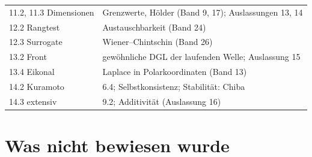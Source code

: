 \begin{merksatz}
\begin{center}
{\begin{tabular}{@{}P{3.4cm}P{5.2cm}@{}}
11.2, 11.3 Dimensionen & Grenzwerte, Hölder (Band 9, 17); Auslassungen 13, 14\\
12.2 Rangtest & Austauschbarkeit (Band 24)\\
12.3 Surrogate & Wiener--Chintschin (Band 26)\\
13.2 Front & gewöhnliche DGL der laufenden Welle; Auslassung 15\\
13.4 Eikonal & Laplace in Polarkoordinaten (Band 13)\\
14.2 Kuramoto & 6.4; Selbstkonsistenz; Stabilität: Chiba\\
14.3 extensiv & 9.2; Additivität (Auslassung 16)\\
\bottomrule
\end{tabular}}
\end{center}
\end{merksatz}

\section{Was nicht bewiesen wurde}

